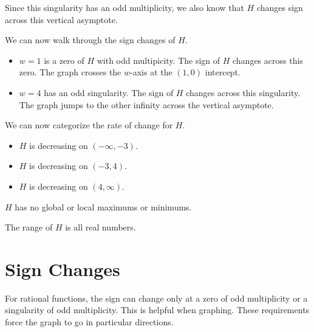 \documentclass{ximera}
\begin{document}
\begin{example}
Since this singularity has an odd multiplicity, we also know that $H$ changes sign across this vertical asymptote.


We can now walk through the sign changes of $H$.

\begin{itemize}
\item $w = 1$ is a zero of $H$ with odd multipicity.  The sign of $H$ changes across this zero. The graph crosses the $w$-axis at the $(1, 0)$ intercept.
\item $w = 4$ has an odd singularity. The sign of $H$ changes across this singularity.  The graph jumps to the other infinity across the vertical asymptote.
\end{itemize}



We can now categorize the rate of change for $H$.

\begin{itemize}
\item $H$ is decreasing on $(-\infty, -3)$.
\item $H$ is decreasing on $(-3, 4)$.
\item $H$ is decreasing on $(4,\infty)$.
\end{itemize}

$H$ has no global or local maximums or minimums.



The range of $H$ is all real numbers.

\end{example}







\section{Sign Changes}

For rational functions, the sign can change only at a zero of odd multiplicity or a singularity of odd multiplicity. This is helpful when graphing. These requirements force the graph to go in particular directions.
\end{document}
